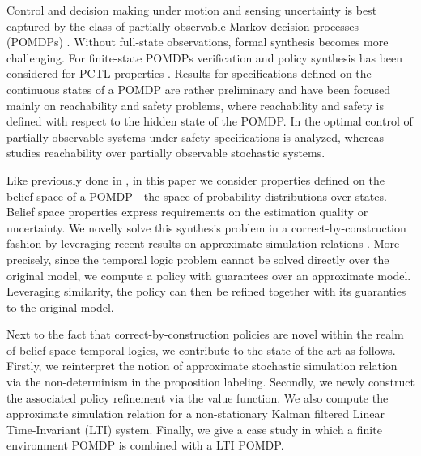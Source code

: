 \documentclass{ifacconf}
\newcommand{\new}[1]{{\color{blue}#1}}
\begin{document}
Control and decision making under motion and sensing uncertainty is best captured by the class of partially observable Markov decision processes (POMDPs) \citep{Kaelbling98,Smallwood73}. Without full-state observations, formal synthesis becomes more challenging. For finite-state POMDPs verification and policy synthesis has been considered for PCTL properties \citep{Norman2017, Chatterjee2014}. Results for specifications defined on the continuous states of a POMDP are rather preliminary and have been focused mainly on reachability and safety problems, where reachability and safety is defined with respect to the hidden state of the POMDP. In \citep{ding2013optimal} the optimal control of partially observable systems under safety specifications is analyzed, whereas \citep{LESSER20141989} studies reachability over partially observable stochastic systems.

Like previously done in  \citep{Vasile2016,JonesDTL2013}, in this paper we consider properties defined on the belief space of a POMDP---the space of probability distributions over states. Belief space properties express requirements on the estimation quality or uncertainty. We novelly solve this synthesis problem in a  correct-by-construction fashion by leveraging recent results on  approximate simulation relations \citep{haesaert2017verification, tech_report_TACAS}.
More precisely, since the temporal logic problem cannot be solved directly over the original model, we compute a policy with guarantees over an approximate model. Leveraging similarity, the policy can then be refined together with  its guaranties  to the original model.

\new{Next to the fact that correct-by-construction policies are novel within the realm of belief space temporal logics, we contribute to the state-of-the art as follows.
 Firstly, we reinterpret the notion of approximate stochastic simulation relation via the non-determinism in the proposition labeling. Secondly, we newly construct the associated policy refinement via the value function. We also compute the approximate simulation relation for a non-stationary Kalman filtered  Linear Time-Invariant (LTI) system.   Finally,  we give a case study in which a finite environment POMDP is combined with a LTI POMDP.}

\end{document}
